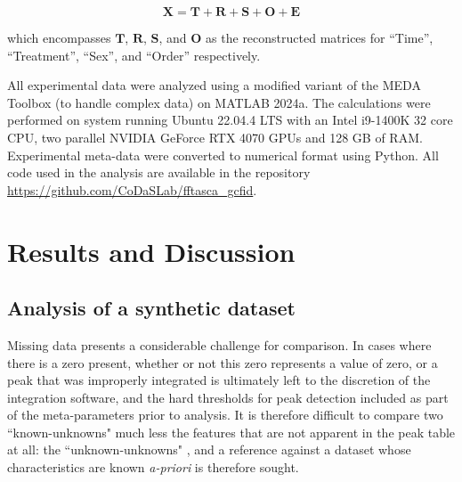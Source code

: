 \documentclass[preprint,12pt]{elsarticle}
\begin{document}
\begin{equation}\label{eq:GLM}
    \mathbf{X} = \mathbf{T} + \mathbf{R} + \mathbf{S} + \mathbf{O} + \mathbf{E}
\end{equation}

\noindent which encompasses $\mathbf{T}$, $\mathbf{R}$, $\mathbf{S}$, and $\mathbf{O}$ as the reconstructed matrices for ``Time'', ``Treatment'', ``Sex'', and ``Order'' respectively. 

All experimental data were analyzed using a modified variant of the MEDA Toolbox (to handle complex data) on MATLAB 2024a. The calculations were performed on system running Ubuntu 22.04.4 LTS with an Intel i9-1400K 32 core CPU, two parallel NVIDIA GeForce RTX 4070 GPUs and 128 GB of RAM. Experimental meta-data were converted to numerical format using Python. All code used in the analysis are available in the repository \url{https://github.com/CoDaSLab/fftasca_gcfid}.

\section{Results and Discussion}

\subsection{Analysis of a synthetic dataset}\label{sec:2.1}

Missing data presents a considerable challenge for comparison. In cases where there is a zero present, whether or not this zero represents a value of zero, or a peak that was improperly integrated is ultimately left to the discretion of the integration software, and the hard thresholds for peak detection included as part of the meta-parameters prior to analysis. It is therefore difficult to compare two ``known-unknowns" much less the features that are not apparent in the peak table at all: the ``unknown-unknowns" \cite{rumsfeld2002}, and a reference against a dataset whose characteristics are known \textit{a-priori} is therefore sought.
\end{document}

